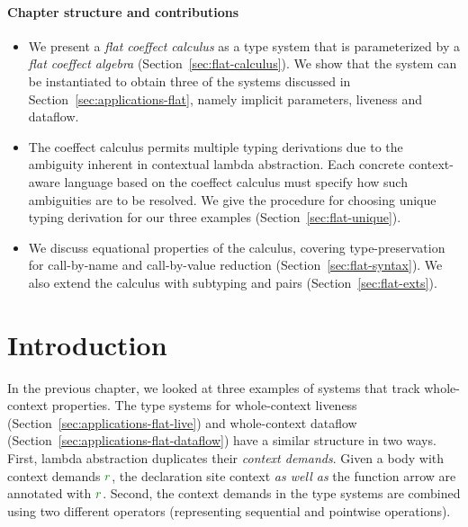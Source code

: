 \paragraph{Chapter structure and contributions}
\begin{itemize}
\item We present a \emph{flat coeffect calculus} as a type system that is parameterized by a
  \emph{flat coeffect algebra} (Section~\ref{sec:flat-calculus}). We show that the system can be
  instantiated to obtain three of the systems discussed in Section~\ref{sec:applications-flat},
  namely implicit parameters, liveness and dataflow.

\item The coeffect calculus permits multiple typing derivations due to the ambiguity inherent
  in contextual lambda abstraction. Each concrete context-aware language based on the
  coeffect calculus must specify how such ambiguities are to be resolved. We give the procedure for
  choosing unique typing derivation for our three examples (Section~\ref{sec:flat-unique}).

\item We discuss equational properties of the calculus, covering type-pre\-ser\-vation for call-by-name
  and call-by-value reduction (Section~\ref{sec:flat-syntax}). We also extend the calculus
  with subtyping and pairs (Section~\ref{sec:flat-exts}).
\end{itemize}

%
%

\section{Introduction}
\label{sec:flat-intro}

In the previous chapter, we looked at three examples of systems that track whole-context
properties. The type systems for whole-context liveness (Section~\ref{sec:applications-flat-live})
and whole-context dataflow (Section~\ref{sec:applications-flat-dataflow}) have a similar
structure in two ways. First, lambda abstraction duplicates their \emph{context demands}. Given a
body with context demands $\cclrd{r}$, the declaration site context \emph{as well as} the function
arrow are annotated with $\cclrd{r}$. Second, the context demands in the type systems are combined
using two different operators (representing sequential and pointwise operations).

